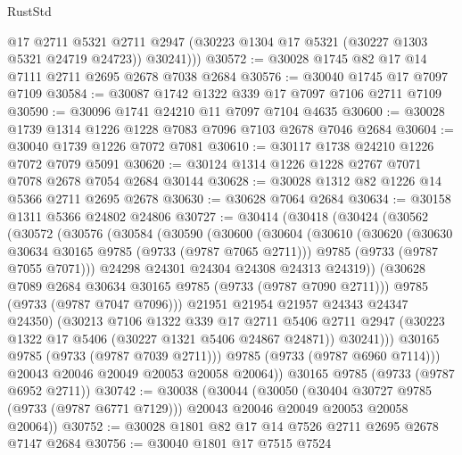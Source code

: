 \begin{lexlean}{RustStd}
\begin{coremodule}
          @17
          @2711
          @5321
          @2711
          @2947
          (@30223 @1304 @17 @5321 (@30227 @1303 @5321 @24719 @24723))
          @30241)))
@30572 := @30028 @1745 @82 @17 @14 @7111 @2711 @2695 @2678 @7038 @2684
@30576 := @30040 @1745 @17 @7097 @7109
@30584 := @30087 @1742 @1322 @339 @17 @7097 @7106 @2711 @7109
@30590 := @30096 @1741 @24210 @11 @7097 @7104 @4635
@30600 := @30028 @1739 @1314 @1226 @1228 @7083 @7096 @7103 @2678 @7046 @2684
@30604 := @30040 @1739 @1226 @7072 @7081
@30610 := @30117 @1738 @24210 @1226 @7072 @7079 @5091
@30620 := @30124 @1314 @1226 @1228 @2767 @7071 @7078 @2678 @7054 @2684 @30144
@30628 := @30028 @1312 @82 @1226 @14 @5366 @2711 @2695 @2678
@30630 := @30628 @7064 @2684
@30634 := @30158 @1311 @5366 @24802 @24806
@30727 := @30414
    (@30418
      (@30424
        (@30562
          (@30572
            (@30576
              (@30584
                (@30590
                  (@30600
                    (@30604
                      (@30610
                        (@30620
                          (@30630 @30634 @30165 @9785 (@9733 (@9787 @7065 @2711)))
                          @9785
                          (@9733 (@9787 @7055 @7071)))
                        @24298
                        @24301
                        @24304
                        @24308
                        @24313
                        @24319))
                    (@30628 @7089 @2684 @30634 @30165 @9785 (@9733 (@9787 @7090 @2711)))
                    @9785
                    (@9733 (@9787 @7047 @7096)))
                  @21951
                  @21954
                  @21957
                  @24343
                  @24347
                  @24350)
                (@30213
                  @7106
                  @1322
                  @339
                  @17
                  @2711
                  @5406
                  @2711
                  @2947
                  (@30223 @1322 @17 @5406 (@30227 @1321 @5406 @24867 @24871))
                  @30241)))
            @30165
            @9785
            (@9733 (@9787 @7039 @2711)))
          @9785
          (@9733 (@9787 @6960 @7114)))
        @20043
        @20046
        @20049
        @20053
        @20058
        @20064))
    @30165
    @9785
    (@9733 (@9787 @6952 @2711))
@30742 := @30038
    (@30044
      (@30050
        (@30404 @30727 @9785 (@9733 (@9787 @6771 @7129)))
        @20043
        @20046
        @20049
        @20053
        @20058
        @20064))
@30752 := @30028 @1801 @82 @17 @14 @7526 @2711 @2695 @2678 @7147 @2684
@30756 := @30040 @1801 @17 @7515 @7524

\end{coremodule}
\end{lexlean}
